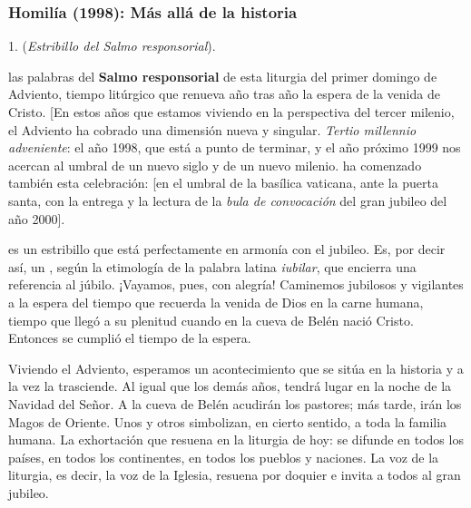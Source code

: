 \newpage
\subsubsection{Homilía (1998): Más allá de la historia}


\begin{body}
	1.  (\emph{Estribillo del Salmo responsorial}). 
	
	 las palabras del \textbf{Salmo responsorial} de esta liturgia del primer domingo de Adviento, tiempo litúrgico que renueva año tras año la espera de la venida de Cristo. {[}En estos años que estamos viviendo en la perspectiva del tercer milenio, el Adviento ha cobrado una dimensión nueva y singular. \emph{Tertio millennio adveniente}: el año 1998, que está a punto de terminar, y el año próximo 1999 nos acercan al umbral de un nuevo siglo y de un nuevo milenio.  ha comenzado también esta celebración: {[}en el umbral de la basílica vaticana, ante la puerta santa, con la entrega y la lectura de la \emph{bula de convocación} del gran jubileo del año 2000{]}. 
	
	 es un estribillo que está perfectamente en armonía con el jubileo. Es, por decir así, un , según la etimología de la palabra latina \emph{iubilar}, que encierra una referencia al júbilo. ¡Vayamos, pues, con alegría! Caminemos jubilosos y vigilantes a la espera del tiempo que recuerda la venida de Dios en la carne humana, tiempo que llegó a su plenitud cuando en la cueva de Belén nació Cristo. Entonces se cumplió el tiempo de la espera. 
	
	Viviendo el Adviento, esperamos un acontecimiento que se sitúa en la historia y a la vez la trasciende. Al igual que los demás años, tendrá lugar en la noche de la Navidad del Señor. A la cueva de Belén acudirán los pastores; más tarde, irán los Magos de Oriente. Unos y otros simbolizan, en cierto sentido, a toda la familia humana. La exhortación que resuena en la liturgia de hoy:  se difunde en todos los países, en todos los continentes, en todos los pueblos y naciones. La voz de la liturgia, es decir, la voz de la Iglesia, resuena por doquier e invita a todos al gran jubileo. 
	

\end{body}
